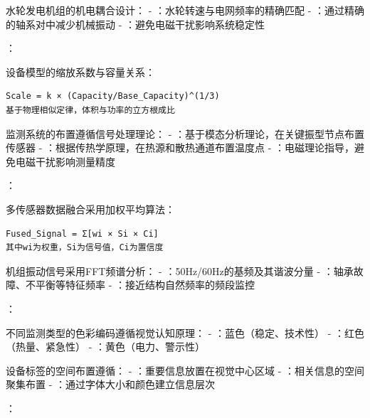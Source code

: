 
水轮发电机组的机电耦合设计： - ：水轮转速与电网频率的精确匹配 - ：通过精确的轴系对中减少机械振动 - ：避免电磁干扰影响系统稳定性

：


设备模型的缩放系数与容量关系：

\begin{lstlisting}
Scale = k × (Capacity/Base_Capacity)^(1/3)
基于物理相似定律，体积与功率的立方根成比
\end{lstlisting}


监测系统的布置遵循信号处理理论： - ：基于模态分析理论，在关键振型节点布置传感器 - ：根据传热学原理，在热源和散热通道布置温度点 - ：电磁理论指导，避免电磁干扰影响测量精度

：


多传感器数据融合采用加权平均算法：

\begin{lstlisting}
Fused_Signal = Σ[wi × Si × Ci]
其中wi为权重，Si为信号值，Ci为置信度
\end{lstlisting}


机组振动信号采用FFT频谱分析： - ：50Hz/60Hz的基频及其谐波分量 - ：轴承故障、不平衡等特征频率 - ：接近结构自然频率的频段监控

：


不同监测类型的色彩编码遵循视觉认知原理： - ：蓝色（稳定、技术性） - ：红色（热量、紧急性） - ：黄色（电力、警示性）


设备标签的空间布置遵循： - ：重要信息放置在视觉中心区域 - ：相关信息的空间聚集布置 - ：通过字体大小和颜色建立信息层次

：

